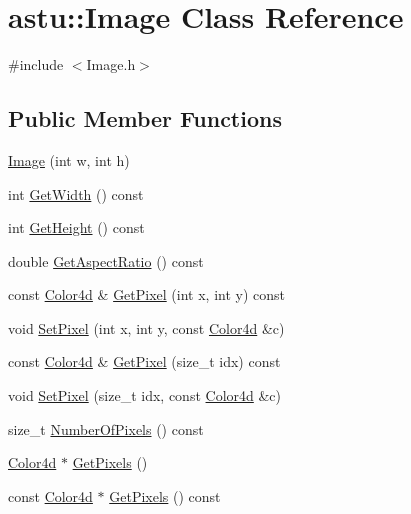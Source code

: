\hypertarget{classastu_1_1Image}{}\section{astu\+:\+:Image Class Reference}
\label{classastu_1_1Image}


{\ttfamily \#include $<$Image.\+h$>$}

\subsection*{Public Member Functions}
\begin{DoxyCompactItemize}
\item 
\hyperlink{classastu_1_1Image_a930c3dfe86d60d209199cf27d2102446}{Image} (int w, int h)
\item 
int \hyperlink{classastu_1_1Image_a654888b88e109da1099ade3ec54f0520}{Get\+Width} () const
\item 
int \hyperlink{classastu_1_1Image_ad64d3b2abc18e54ba8beb4e212a75a10}{Get\+Height} () const
\item 
double \hyperlink{classastu_1_1Image_a06bdd931e5090f1eca62bd305b83cfd5}{Get\+Aspect\+Ratio} () const
\item 
const \hyperlink{classastu_1_1Color}{Color4d} \& \hyperlink{classastu_1_1Image_ab1e0df707f4ededc00ebf61388b661a3}{Get\+Pixel} (int x, int y) const
\item 
void \hyperlink{classastu_1_1Image_ae9878863c584d4e848e645de82e4d746}{Set\+Pixel} (int x, int y, const \hyperlink{classastu_1_1Color}{Color4d} \&c)
\item 
const \hyperlink{classastu_1_1Color}{Color4d} \& \hyperlink{classastu_1_1Image_ab0edf3270d0e0e038f05cdea7ecc7ca3}{Get\+Pixel} (size\+\_\+t idx) const
\item 
void \hyperlink{classastu_1_1Image_aa3121a767b7ef35e3ea9d22d6d856f27}{Set\+Pixel} (size\+\_\+t idx, const \hyperlink{classastu_1_1Color}{Color4d} \&c)
\item 
size\+\_\+t \hyperlink{classastu_1_1Image_a53c53ecc0210786efa7f514966ad406b}{Number\+Of\+Pixels} () const
\item 
\hyperlink{classastu_1_1Color}{Color4d} $\ast$ \hyperlink{classastu_1_1Image_ae5f383d05ec314b828d005041c53c583}{Get\+Pixels} ()
\item 
const \hyperlink{classastu_1_1Color}{Color4d} $\ast$ \hyperlink{classastu_1_1Image_a6f4f7b5a1ccfac64a7d4d902b428717f}{Get\+Pixels} () const
\end{DoxyCompactItemize}


